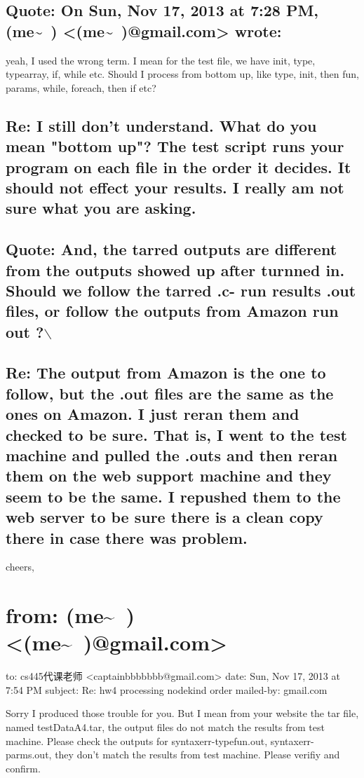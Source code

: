 \documentclass[12pt]{book}
\begin{document}
\subsection{Quote: On Sun, Nov 17, 2013 at 7:28 PM, (me\textasciitilde{}~) <(me\textasciitilde{}~)@gmail.com> wrote:}
\label{sec-48-5-1}
yeah, I used the wrong term. I mean for the test file, we have init, type, typearray, if, while etc. Should I process from bottom up, like type, init, then fun, params, while, foreach, then if etc? 

\subsection{Re: I still don't understand.    What do you mean "bottom up"?    The test script runs your program on each file in the order it decides.   It should not effect your results.   I really am not sure what you are asking.}
\label{sec-48-5-2}

\subsection{Quote: And, the tarred outputs are different from the outputs showed up after turnned in. Should we follow the tarred .c- run results .out files, or follow the outputs from Amazon run out ?$\backslash$}
\label{sec-48-5-3}

\subsection{Re: The output from Amazon is the one to follow, but the .out files are the same as the ones on Amazon.    I just reran them and checked to be sure.   That is, I went to the test machine and pulled the .outs and then reran them on the web support machine and they seem to be the same.   I repushed them to the web server to be sure there is a clean copy there in case there was problem.}
\label{sec-48-5-4}

cheers,


\section{from:         (me\textasciitilde{}~) <(me\textasciitilde{}~)@gmail.com>}
\label{sec-48-6}
to:         cs445代课老师 <captainbbbbbbb@gmail.com>
date:         Sun, Nov 17, 2013 at 7:54 PM
subject:         Re: hw4 processing nodekind order
mailed-by:         gmail.com

Sorry I produced those trouble for you. But I mean from your website the tar file, named testDataA4.tar, the output files do not match the results from test machine. Please check the outputs for syntaxerr-typefun.out, syntaxerr-parms.out, they don't match the results from test machine. Please verifiy and confirm.
\end{document}

